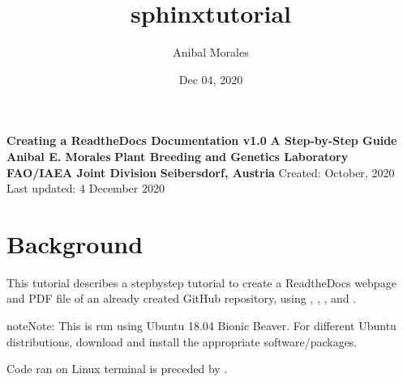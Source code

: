 \documentclass[letterpaper,10pt,english]{sphinxhowto}
\title{sphinx\sphinxhyphen{}tutorial}
\date{Dec 04, 2020}
\author{Anibal Morales}
\begin{document}
\pagestyle{empty}

        \begin{titlepage}
            \vspace*{10mm} %
            \flushright\textbf{\Huge {Creating a ReadtheDocs Documentation v1.0}}
            \vspace{0mm} %
            \textbf{\Large {A Step-by-Step Guide}}
            \vspace{50mm} %
            \textbf{\Large {Anibal E. Morales}}
            \vspace{10mm} %
            \textbf{\Large {Plant Breeding and Genetics Laboratory}}
            \vspace{0mm} %
            \textbf{\Large {FAO/IAEA Joint Division}}
            \vspace{0mm} %
            \textbf{\Large {Seibersdorf, Austria}}
            \vspace{10mm} %
            \normalsize Created: October, 2020
            \vspace*{0mm} %
            \normalsize  Last updated: 4 December 2020
            \vfill
            \small{}
        \end{titlepage}
        \newcommand{\sectionbreak}{\clearpage}

\pagestyle{plain}
\sphinxtableofcontents
\pagestyle{normal}
\label{\detokenize{index::doc}}



\section{Background}
\label{\detokenize{index:background}}
This tutorial describes a step\sphinxhyphen{}by\sphinxhyphen{}step tutorial to create a ReadtheDocs webpage and PDF file of an already created GitHub repository, using , , , and .

\begin{sphinxadmonition}{note}{Note:}
This is run using Ubuntu 18.04 Bionic Beaver. For different Ubuntu distributions, download and install the appropriate software/packages.

Code ran on Linux terminal is preceded by \sphinxcode{\sphinxupquote{\$}}.
\end{sphinxadmonition}
\end{document}
